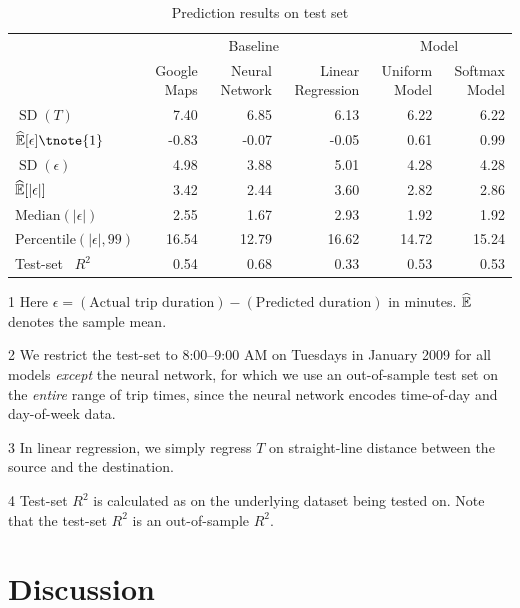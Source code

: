 \documentclass{article}
\newcommand{\sd}{\operatorname{SD}}
\begin{document}
\begin{table}[h!]
\centering
\begin{threeparttable}
\begin{tabular}{lrrrrr}
\toprule
& \multicolumn{3}{c}{Baseline} & \multicolumn{2}{c}{Model} \\\cmidrule(r){2-4} \cmidrule(l){5-6} 
{} & Google Maps & Neural Network\tnote{2} & Linear Regression\tnote{3} & Uniform Model & Softmax Model \\
\midrule
$\sd(T)$ & 7.40 & 6.85& 6.13&  6.22 & 6.22 \\ [1em]
$\hat \E[\epsilon]\tnote{1}$ & -0.83 &-0.07 & -0.05&  0.61 & 0.99 \\
$\sd(\epsilon)$ & 4.98 & 3.88& 5.01&  4.28 & 4.28 \\[1em]
$\widehat {\mathbb{E}}[|\epsilon|]$ & 3.42 & 2.44& 3.60&  2.82 & 2.86 \\
$\text{Median}(|\epsilon|)$ & 2.55 & 1.67& 2.93 &  1.92 & 1.92 \\
$\text{Percentile}(|\epsilon|, 99)$ & 16.54 &12.79 & 16.62&  14.72 & 15.24 \\ [1em]
Test-set\tnote{4}  \, $R^2$ & 0.54 & 0.68& 0.33 & 0.53 & 0.53 \\
\bottomrule
\end{tabular}
\caption{Prediction results on test set}
\label{tab:mainres}
\begin{tablenotes}
\item[1] Here $\epsilon = (\text{Actual trip duration}) - (\text{Predicted duration})$ in minutes. $\widehat {\mathbb{E}}$ denotes the sample mean. 
\item[2] We restrict the test-set to 8:00--9:00 AM on Tuesdays in January 2009 for all models \emph{except} the neural network, for which we use an out-of-sample test set on the \emph{entire} range of trip times, since the neural network encodes time-of-day and day-of-week data. 
\item[3]In linear regression, we simply regress $T$ on straight-line distance between the source and the destination.  
\item[4] Test-set $R^2$ is calculated as  on the underlying dataset being tested on. Note that the test-set $R^2$ is an out-of-sample $R^2$. 
\end{tablenotes}
\end{threeparttable}
\end{table}


\section{Discussion}
\end{document}
